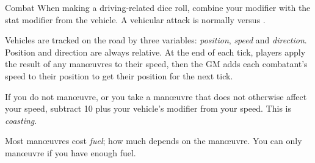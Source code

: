 
\begin{abstractsection}{Combat}
When making a driving-related dice roll, combine your  modifier with the stat modifier from the vehicle. A vehicular attack is normally  versus .

Vehicles are tracked on the road by three variables: \emph{position}, \emph{speed} and \emph{direction}. Position and direction are always relative. At the end of each tick, players apply the result of any man\oe{}uvres to their speed, then the GM adds each combatant's speed to their position to get their position for the next tick.

If you do not man\oe{}uvre, or you take a man\oe{}uvre that does not otherwise affect your speed, subtract 10 plus your vehicle's  modifier from your speed. This is \emph{coasting}.

Most man\oe{}uvres cost \emph{fuel}; how much depends on the man\oe{}uvre. You can only man\oe{}uvre if you have enough fuel.
\end{abstractsection}
